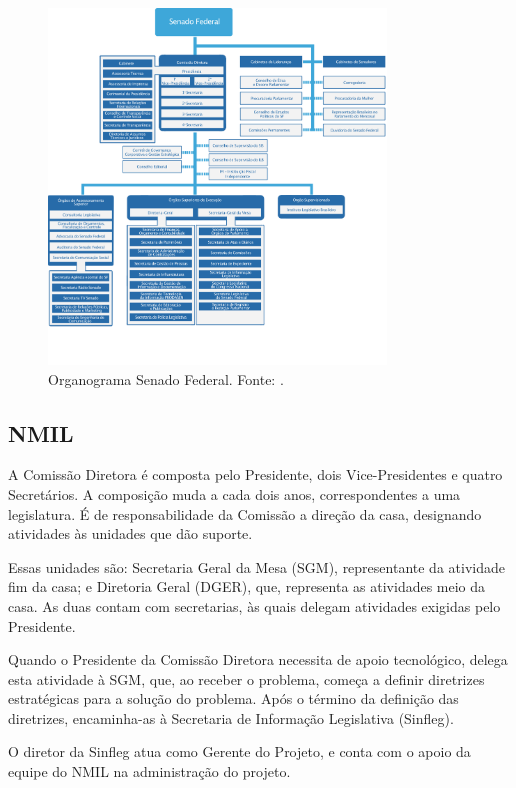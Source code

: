 \begin{figure}[H]
	\centering
	\includegraphics[width=0.8\textwidth]{figuras/organograma_senado.png}
	\caption{Organograma Senado Federal. Fonte: .}
	\label{img:organograma_senado}
\end{figure}

\subsection{NMIL}

A Comissão Diretora é composta pelo Presidente, dois Vice-Presidentes e quatro
Secretários. A composição muda a cada dois anos, correspondentes a uma legislatura. É de responsabilidade da Comissão a direção da casa, designando atividades às unidades que dão suporte.

Essas unidades são: Secretaria Geral da Mesa (SGM), representante da atividade fim da casa; e Diretoria Geral (DGER), que, representa as atividades meio da casa. As duas contam com secretarias, às quais delegam atividades exigidas pelo Presidente.

Quando o Presidente da Comissão Diretora necessita de apoio tecnológico, delega esta
atividade à SGM, que, ao receber o problema, começa a definir diretrizes estratégicas para a solução do problema. Após o término da definição das diretrizes, encaminha-as à Secretaria de Informação Legislativa (Sinfleg).

O diretor da Sinfleg atua como Gerente do Projeto, e conta com o apoio da equipe do
NMIL na administração do projeto.

